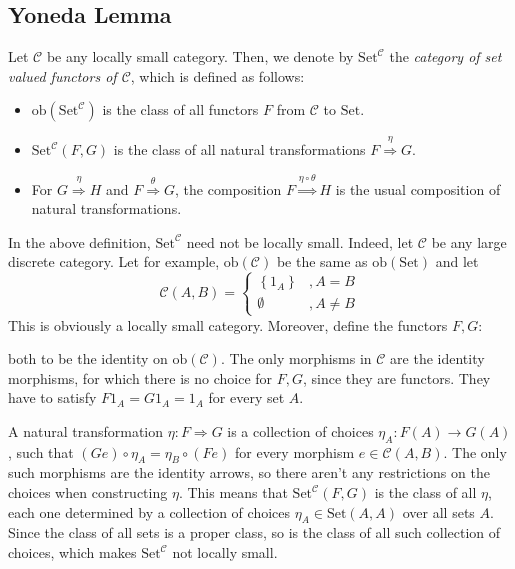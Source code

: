 \subsection{Yoneda Lemma}
\begin{definition} Let $\mathcal{C}$ be any locally small category. Then, we denote by $\mathrm{Set}^{\mathcal{C}}$ the \emph{category of set valued functors of $\mathcal{C}$}, which is defined as follows:
\begin{itemize}
\item $\mathrm{ob}\left(\mathrm{Set}^{\mathcal{C}}\right)$ is the class of all functors $F$ from $\mathcal{C}$ to $\mathrm{Set}$.
\item $\mathrm{Set}^{\mathcal{C}}(F,G)$ is the class of all natural transformations $F\overset{\eta}{\Rightarrow}G$.
\item For $G\overset{\eta}{\Rightarrow}H$ and $F\overset{\theta}{\Rightarrow}G$, the composition $F\overset{\eta\circ\theta}{\Rightarrow}H$ is the usual composition of natural transformations.
\end{itemize}
\end{definition}
\begin{remark} In the above definition, $\mathrm{Set}^{\mathcal{C}}$ need not be locally small. Indeed, let $\mathcal{C}$ be any large discrete category. Let for example, $\mathrm{ob}(\mathcal{C})$ be the same as $\mathrm{ob}(\mathrm{Set})$ and let
\[\mathcal{C}(A,B)=\left\{\begin{array}{ll}\left\{1_A\right\}&,A=B\\\emptyset&,A\neq B\end{array}\right.\]
This is obviously a locally small category. Moreover, define the functors $F,G$:
\begin{center}
\end{center}
both to be the identity on $\mathrm{ob}(\mathcal{C})$. The only morphisms in $\mathcal{C}$ are the identity morphisms, for which there is no choice for $F,G$, since they are functors. They have to satisfy $F1_A=G1_A=1_A$ for every set $A$.

A natural transformation $\eta:F\Rightarrow G$ is a collection of choices $\eta_A:F(A)\to G(A)$, such that $(Ge)\circ\eta_A=\eta_B\circ(Fe)$ for every morphism $e\in\mathcal{C}(A,B)$. The only such morphisms are the identity arrows, so there aren't any restrictions on the choices when constructing $\eta$. This means that $\mathrm{Set}^{\mathcal{C}}(F,G)$ is the class of all $\eta$, each one determined by a collection of choices $\eta_A\in\mathrm{Set}(A,A)$ over all sets $A$. Since the class of all sets is a proper class, so is the class of all such collection of choices, which makes $\mathrm{Set}^{\mathcal{C}}$ not locally small.
\end{remark}

